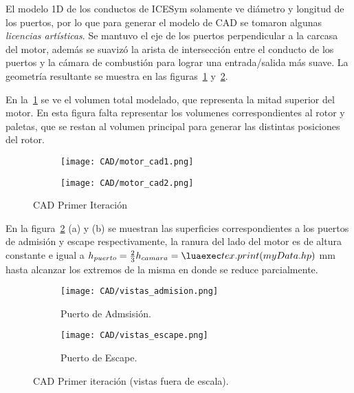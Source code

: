 El modelo 1D de los conductos de ICESym solamente ve diámetro y longitud  de los
puertos, por lo que para generar el modelo de CAD se tomaron algunas
\emph{licencias artísticas}.
%
Se mantuvo el eje de los puertos perpendicular a la carcasa del motor, además se
suavizó la arista de intersección entre el conducto de los puertos y la cámara
de combustión para lograr una entrada/salida más suave.
%
La geometría resultante se muestra en las figuras~\ref{fig:motor_cad1}
y~\ref{fig:motor_cad2}.

En la~\ref{fig:motor_cad1} se ve el volumen total modelado, que representa la
mitad superior del motor.
%
En esta figura falta representar los volumenes correspondientes al rotor y
paletas, que se restan al volumen principal para generar las distintas
posiciones del rotor.


\begin{figure}
  \centering
    \begin{subfigure}{0.4\textwidth}
        \centering
        \texttt{[image: CAD/motor\_cad1.png]}
    \end{subfigure}
    \begin{subfigure}{0.4\textwidth}
        \centering
        \texttt{[image: CAD/motor\_cad2.png]}
    \end{subfigure}
  \caption{CAD Primer Iteración}\label{fig:motor_cad1}
\end{figure}

En la figura~\ref{fig:motor_cad2} (a) y (b) se muestran las superficies
correspondientes a los puertos de admisión y escape respectivamente, la ranura
del lado del motor es de altura constante e igual a $h_{puerto} = \frac{2}{3}
h_{camara} = \lua{tex.print(myData.hp)}$ mm hasta alcanzar los extremos de la
misma en donde se reduce parcialmente.

\begin{figure}
  \centering
    \begin{subfigure}{0.8\textwidth}
        \centering
        \texttt{[image: CAD/vistas\_admision.png]}
        \caption{Puerto de Admsisión.}
    \end{subfigure}
    \begin{subfigure}{0.8\textwidth}
        \centering
        \texttt{[image: CAD/vistas\_escape.png]}
        \caption{Puerto de Escape.}
    \end{subfigure}
  \caption{CAD Primer iteración (vistas fuera de escala).}\label{fig:motor_cad2}
\end{figure}
